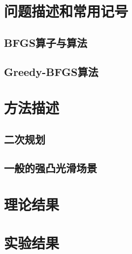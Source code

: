 \documentclass[a4paper,twoside,AutoFakeBold]{article}
\theoremstyle{definition}
\begin{document}
%
\section{问题描述和常用记号}\label{section:preliminary}

\subsection{BFGS算子与算法}

\subsection{Greedy-BFGS算法}

%
\section{方法描述}\label{section:methods}

\subsection{二次规划}

\subsection{一般的强凸光滑场景}


%
\section{理论结果}\label{section:theory}

%
\section{实验结果}\label{section:experiment}
\end{document}

